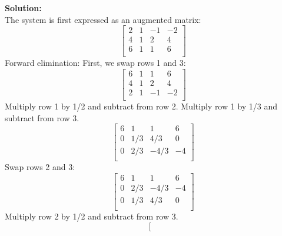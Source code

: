 \documentclass[12pt]{article}
\begin{document}
\begin{description}
    \ifsolution
    \color{red}
        {\bf Solution:}\\
        The system is first expressed as an augmented matrix:
        \begin{equation*}
        \left[
          \begin{array}{cccc }
               2 & 1 & -1 & -2 \\
               4 & 1 &  2 &  4 \\
               6 & 1 &  1 & 6 \\
          \end{array}
        \right]
        \end{equation*}
        Forward elimination: First, we swap rows 1 and 3:
        \begin{equation*}
        \left[
          \begin{array}{cccc }
               6 & 1 &  1 & 6 \\
               4 & 1 &  2 &  4 \\
               2 & 1 &  -1 & -2 \\
          \end{array}
        \right]
        \end{equation*}
        Multiply row 1 by 1/2 and subtract from row 2. Multiply row 1 by 1/3 and subtract from row 3.
        \begin{equation*}
        \left[
          \begin{array}{cccc }
               6 & 1 &  1 & 6 \\
               0 & 1/3 &  4/3 &  0 \\
               0 & 2/3 &  -4/3 & -4 \\
          \end{array}
        \right]
        \end{equation*}
        Swap rows 2 and 3:
        \begin{equation*}
        \left[
          \begin{array}{cccc }
               6 & 1 &  1 & 6 \\
               0 & 2/3 &  -4/3 & -4 \\
               0 & 1/3 &  4/3 &  0 \\
          \end{array}
        \right]
        \end{equation*}
        Multiply row 2 by 1/2 and subtract from row 3.
        \begin{equation*}
        \left[
          \begin{array}{cccc }

\end{array}
\end{equation*}
\end{description}
\end{document}

